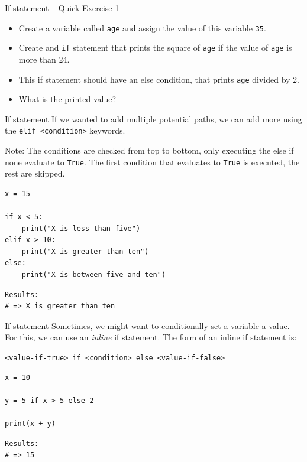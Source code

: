 \documentclass[10pt]{beamer}
\begin{document}
\begin{frame}[label={sec:org22b5cce},fragile]{If statement -- Quick Exercise 1}
 \begin{itemize}
\item Create a variable called \texttt{age} and assign the value of this variable \texttt{35}.
\item Create and \texttt{if} statement that prints the square of \texttt{age} if the value of \texttt{age} is more
than 24.
\item This if statement should have an else condition, that prints \texttt{age} divided by 2.
\item What is the printed value?
\end{itemize}
\end{frame}

\begin{frame}[label={sec:org62b85ee},fragile]{If statement}
 If we wanted to add multiple potential paths, we can add more using the \texttt{elif
<condition>} keywords.

Note: The conditions are checked from top to bottom, only executing the else if none
evaluate to \texttt{True}. The first condition that evaluates to \texttt{True} is executed, the rest
are skipped.

\begin{verbatim}
x = 15

if x < 5:
    print("X is less than five")
elif x > 10:
    print("X is greater than ten")
else:
    print("X is between five and ten")
\end{verbatim}

\begin{verbatim}
Results: 
# => X is greater than ten
\end{verbatim}
\end{frame}

\begin{frame}[label={sec:org3884aa6},fragile]{If statement}
 Sometimes, we might want to conditionally set a variable a value. For this, we can
use an \emph{inline} if statement. The form of an inline if statement is:

\texttt{<value-if-true> if <condition> else <value-if-false>}

\begin{verbatim}
x = 10

y = 5 if x > 5 else 2

print(x + y)
\end{verbatim}

\begin{verbatim}
Results: 
# => 15
\end{verbatim}
\end{frame}
\end{document}

